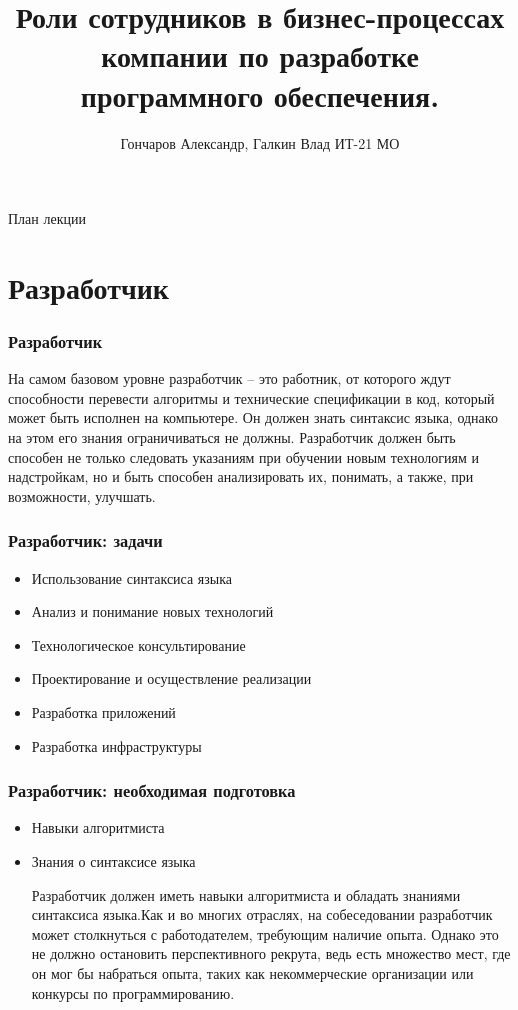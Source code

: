 \documentclass{../industrial-development}
\title{Роли сотрудников в бизнес-процессах компании по разработке программного обеспечения.}
\author{Гончаров Александр, Галкин Влад ИТ-21 МО}
\date{}
\begin{document}
	
	\begin{frame}
		\titlepage
	\end{frame}
	
	\begin{frame}{План лекции}
		\tableofcontents
	\end{frame}
	
	
	\section{Разработчик }
	
	\begin{frame} \frametitle{Разработчик}
		\begin{block}{}
			\alert {}На самом базовом уровне разработчик – это работник, от которого ждут способности перевести алгоритмы и технические спецификации в код, который может быть исполнен на компьютере. Он должен знать синтаксис языка, однако на этом его знания ограничиваться не должны. Разработчик должен быть способен не только следовать указаниям при обучении новым технологиям и надстройкам, но и быть способен анализировать их, понимать, а также, при возможности, улучшать.
			
		\end{block}
		
	\end{frame}
	
	\begin{frame} \frametitle{Разработчик: задачи}
		\begin{itemize}
			\item Использование синтаксиса языка
			\item Анализ и понимание новых технологий
			\item Технологическое консультирование
			\item Проектирование и осуществление реализации
			\item Разработка приложений
			\item Разработка инфраструктуры
		\end{itemize}
	\end{frame}
	
	\begin{frame} \frametitle{Разработчик: необходимая подготовка}
		\begin{itemize}
			\item Навыки алгоритмиста 
			\item Знания о синтаксисе языка
			\begin{block}{}
				\alert {Разработчик} должен иметь навыки алгоритмиста и обладать знаниями синтаксиса языка.Как и во многих отраслях, на собеседовании разработчик может столкнуться с работодателем, требующим наличие опыта. Однако это не должно остановить перспективного рекрута, ведь есть множество мест, где он мог бы набраться опыта, таких как некоммерческие организации или конкурсы по программированию. 
			\end{block}
		\end{itemize}
		
	\end{frame}
	
\end{document}
